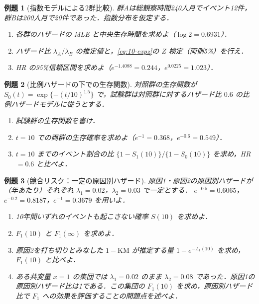 \documentclass[a4paper,11pt,openany]{ltjsbook}
\newtheorem{reidai}{例題}[chapter]
\begin{document}
\begin{reidai}[指数モデルによる2群比較]\label{reidai:10-2}
群Aは総観察時間240人月でイベント12件，群Bは200人月で20件であった．指数分布を仮定する．
\begin{enumerate}[label=(\arabic*)]
\item 各群のハザードの MLE と中央生存時間を求めよ（$\log2=0.6931$）．
\item ハザード比 $\lambda_A/\lambda_B$ の推定値と，\cref{eq:10-expz}の $Z$ 検定（両側5\%）を行え．
\item HR の95\%信頼区間を求めよ（$e^{-1.4088}=0.244$，$e^{0.0225}=1.023$）．
\end{enumerate}
\end{reidai}

\begin{reidai}[比例ハザードの下での生存関数]\label{reidai:10-3}
対照群の生存関数が $S_0(t)=\exp\{-(t/10)^{1.5}\}$ で，試験群は対照群に対するハザード比 $0.6$ の比例ハザードモデルに従うとする．
\begin{enumerate}[label=(\arabic*)]
\item 試験群の生存関数を書け．
\item $t=10$ での両群の生存確率を求めよ（$e^{-1}=0.368$，$e^{-0.6}=0.549$）．
\item $t=10$ までのイベント割合の比 $\{1-S_1(10)\}/\{1-S_0(10)\}$ を求め，HR $=0.6$ と比べよ．
\end{enumerate}
\end{reidai}

\begin{reidai}[競合リスク：一定の原因別ハザード]\label{reidai:10-4}
原因1・原因2の原因別ハザードが（年あたり）それぞれ $\lambda_1=0.02$，$\lambda_2=0.03$ で一定とする．
$e^{-0.5}=0.6065$，$e^{-0.2}=0.8187$，$e^{-1}=0.3679$ を用いよ．
\begin{enumerate}[label=(\arabic*)]
\item 10年間いずれのイベントも起こさない確率 $S(10)$ を求めよ．
\item $F_1(10)$ と $F_1(\infty)$ を求めよ．
\item 原因2を打ち切りとみなした $1-\mathrm{KM}$ が推定する量 $1-e^{-\Lambda_1(10)}$ を求め，$F_1(10)$ と比べよ．
\item ある共変量 $x=1$ の集団では $\lambda_1=0.02$ のまま $\lambda_2=0.08$ であった．原因1の原因別ハザード比は1である．この集団の $F_1(10)$ を求め，原因別ハザード比で $F_1$ への効果を評価することの問題点を述べよ．
\end{enumerate}
\end{reidai}
\end{document}
